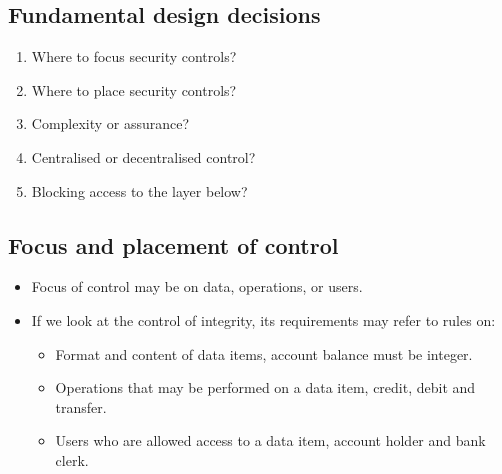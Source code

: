 \documentclass{beamer}
\begin{document}
\subsection{Fundamental design decisions}

\begin{frame}
  \begin{enumerate}
    \item Where to focus security controls?
    \item Where to place security controls?
    \item Complexity or assurance?
    \item Centralised or decentralised control?
    \item Blocking access to the layer below?
  \end{enumerate}
\end{frame}

\subsection{Focus and placement of control}

\begin{frame}
  \begin{itemize}
    \item Focus of control may be on data, operations, or users.

    \item If we look at the control of integrity, its requirements may refer to 
      rules on:
      \begin{itemize}
        \item Format and content of data items, \eg account balance must be 
          integer.

        \item Operations that may be performed on a data item, \eg credit, debit 
          and transfer.

        \item Users who are allowed access to a data item, \eg account holder 
          and bank clerk.
      \end{itemize}
  \end{itemize}
\end{frame}

\end{document}
